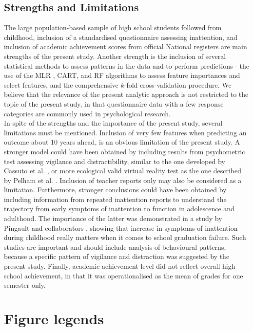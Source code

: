 \documentclass[10pt,letterpaper]{article}
\begin{document}
{ \subsection*{Strengths and Limitations}
The large population-based sample of high school students followed from childhood, inclusion of a standardised questionnaire assessing inattention, and inclusion of academic achievement scores from official National registers are main strengths of the present study. Another strength is the inclusion of several statistical methods to 
assess patterns in the data and to perform predictions  - the use of the MLR , CART, and RF algorithms to assess feature importances and select features, 
and the comprehensive $k$-fold cross-validation procedure. We believe that the relevance of the present analytic approach is not restricted 
to the topic of the present study, in that questionnaire data with a few response categories are commonly used in psychological research. \\


In spite of the strengths and the importance of the present study, several limitations must be mentioned. Inclusion of very few features when predicting an outcome about 10 years ahead, is an obvious limitation of the present study. A stronger model could have been obtained by including results from psychometric test assessing vigilance and distractibility, similar to the one developed by Cassuto et al. \cite{Cassuto2013}, or more ecological valid virtual reality test as the one described by Pelham et al. \cite{Pelham2011}. Inclusion of teacher reports only may also be considered as a limitation.  Furthermore, stronger conclusions could have been obtained by including information from repeated inattention reports to understand the trajectory from early symptoms of inattention to function in adolescence and adulthood. The importance of the latter was demonstrated in a study by Pingault and collaborators \cite{Pingault2014}, showing that increase in symptoms of inattention during childhood really matters when it comes to school graduation failure. Such studies are important and should include analysis of behavioural patterns, because a specific pattern of vigilance and distraction was suggested by the present study. Finally, academic achievement level did not reflect overall high school achievement, in that it was operationalised as the mean of grades for one semester only.\\


\vspace{3mm}
\section*{Figure legends}
}
\end{document}
